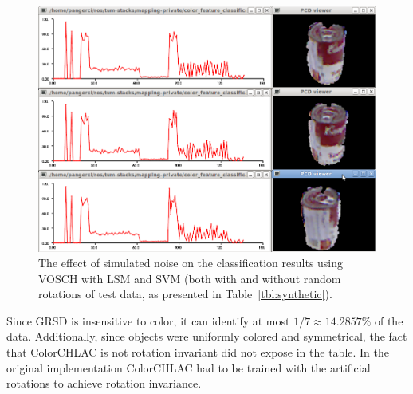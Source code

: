 \documentclass[conference]{sty/IEEEtran}
\begin{document}
\begin{figure}[htb!]
  \begin{center}
    \includegraphics[width=.9\columnwidth]{figures/colorCHLAC/real/tomato/tomato_hist_pcd.png}
    \caption{The effect of simulated noise on the classification results using VOSCH with LSM and SVM
             (both with and without random rotations of test data, as presented in Table~\ref{tbl:synthetic}).}
    \label{fig:plot}
  \end{center}
\end{figure}

Since GRSD is insensitive to color, it can identify at most $1/7 \approx 14.2857\%$ of the data.
Additionally, since objects were uniformly colored and symmetrical, the fact that ColorCHLAC 
is not rotation invariant did not expose in the table. In the original implementation ColorCHLAC 
had to be trained with the artificial rotations to achieve rotation invariance.
\end{document}
